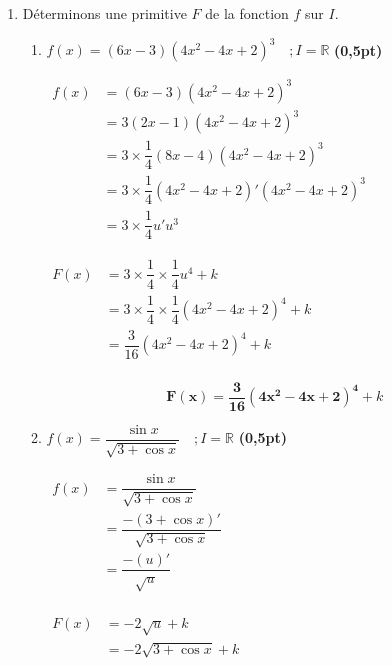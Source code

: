 \documentclass[12pt,a4paper]{article}
\begin{document}
\begin{enumerate}
    \item Déterminons une primitive $F$ de la fonction $f$ sur $I$.
    \begin{enumerate}
        \item $f(x) = (6x - 3)(4x^2 - 4x + 2)^3 \quad ; I = \mathbb{R}$ \textbf{(0,5pt)}
        
        $
        \begin{aligned}
        f(x) &= (6x - 3)(4x^2 - 4x + 2)^3\\
             &= 3(2x - 1)(4x^2 - 4x + 2)^3\\
             &= 3\times \dfrac{1}{4}(8x - 4)(4x^2 - 4x + 2)^3\\
             &= 3\times \dfrac{1}{4}(4x^2 - 4x + 2)'(4x^2 - 4x + 2)^3\\
             &=3\times \dfrac{1}{4}u'u^{3}
        \end{aligned}
        $

        $
        \begin{aligned}
        F(x) &=3\times \dfrac{1}{4}\times \dfrac{1}{4}u^{4} +k\\
             &= 3\times \dfrac{1}{4} \times \dfrac{1}{4} (4x^2 - 4x + 2)^4 +k\\
             &= \dfrac{3}{16} (4x^2 - 4x + 2)^4 +k\\
        \end{aligned}
        $        

\begin{resultbox}
    \[
    \mathbf{F(x) = \dfrac{3}{16} (4x^2 - 4x + 2)^4}+k
    \]
\end{resultbox}        
        
        \item $f(x) = \dfrac{\sin x}{\sqrt{3 + \cos x}} \quad ; I = \mathbb{R}$ \textbf{(0,5pt)}

$
        \begin{aligned}
        f(x) &= \dfrac{\sin x}{\sqrt{3 + \cos x}}\\
             &= \dfrac{-(3 + \cos x)'}{\sqrt{3 + \cos x}}\\
             &= \dfrac{-(u)'}{\sqrt{u}}\\
        \end{aligned}
        $

        $
        \begin{aligned}
        F(x) &= -2\sqrt{u}+k\\
             &= -2\sqrt{3 + \cos x} +k
        \end{aligned}
        $        


\end{enumerate}
\end{enumerate}
\end{document}
